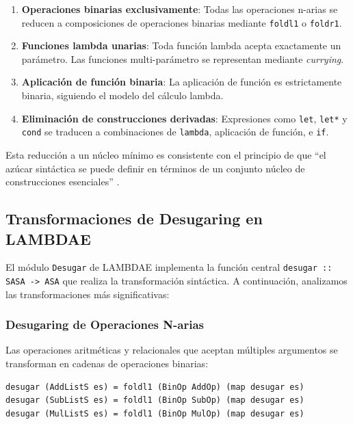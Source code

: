 \documentclass[a4paper,12pt]{article}
\begin{document}
\begin{enumerate}
    \item \textbf{Operaciones binarias exclusivamente}: Todas las operaciones n-arias se reducen a composiciones de operaciones binarias mediante \texttt{foldl1} o \texttt{foldr1}.
    
    \item \textbf{Funciones lambda unarias}: Toda función lambda acepta exactamente un parámetro. Las funciones multi-parámetro se representan mediante \textit{currying}.
    
    \item \textbf{Aplicación de función binaria}: La aplicación de función es estrictamente binaria, siguiendo el modelo del cálculo lambda.
    
    \item \textbf{Eliminación de construcciones derivadas}: Expresiones como \texttt{let}, \texttt{let*} y \texttt{cond} se traducen a combinaciones de \texttt{lambda}, aplicación de función, e \texttt{if}.
\end{enumerate}

Esta reducción a un núcleo mínimo es consistente con el principio de que ``el azúcar sintáctica se puede definir en términos de un conjunto núcleo de construcciones esenciales'' \cite{Rathi2020}.

\subsection{Transformaciones de Desugaring en LAMBDAE}

El módulo \texttt{Desugar} de LAMBDAE implementa la función central \texttt{desugar :: SASA -> ASA} que realiza la transformación sintáctica. A continuación, analizamos las transformaciones más significativas:

\subsubsection{Desugaring de Operaciones N-arias}

Las operaciones aritméticas y relacionales que aceptan múltiples argumentos se transforman en cadenas de operaciones binarias:

\begin{lstlisting}[style=haskellstyle, caption={Desugaring de operaciones n-arias}]
desugar (AddListS es) = foldl1 (BinOp AddOp) (map desugar es)
desugar (SubListS es) = foldl1 (BinOp SubOp) (map desugar es)
desugar (MulListS es) = foldl1 (BinOp MulOp) (map desugar es)
\end{lstlisting}
\end{document}
